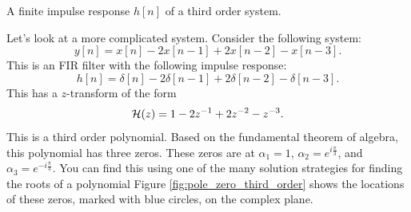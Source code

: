 \begin{marginfigure}
  \begin{center}
  \end{center}
  \caption{A finite impulse response $h[n]$ of a third order system.}
\end{marginfigure}

Let's look at a more complicated system. Consider the following system:
\begin{equation}
  y[n]= x[n]-2x[n-1]+2x[n-2]-x[n-3].
\end{equation}
This is an FIR filter with the following impulse response:
\begin{equation}
  h[n]= \delta[n]-2\delta[n-1]+2\delta[n-2]-\delta[n-3].
\end{equation}
This has a $z$-transform of the form
\begin{equation}
  \mathcal{H}(z) = 1-2z^{-1} + 2z^{-2} - z^{-3}.
\end{equation}
This is a third order polynomial. Based on the fundamental theorem of algebra, this polynomial has three zeros. These zeros are at $\alpha_1=1$,
$\alpha_2=e^{i\frac{\pi}{3}}$, and $\alpha_3=e^{-i\frac{\pi}{3}}$. You can find
this using one of the many solution strategies for finding the roots
of a polynomial Figure \ref{fig:pole_zero_third_order} shows the
locations of these zeros, marked with blue circles, on the complex
plane.



